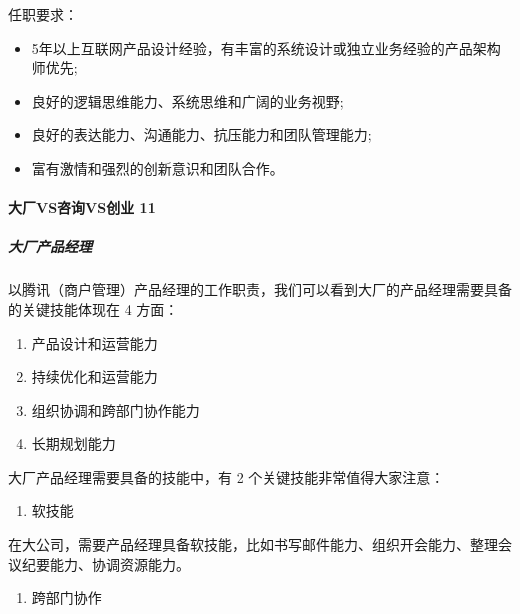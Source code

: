 \documentclass[letterpaper,10pt,english]{sphinxmanual}
\begin{document}
任职要求：
\begin{itemize}
\item {} 
5年以上互联网产品设计经验，有丰富的系统设计或独立业务经验的产品架构师优先;

\item {} 
良好的逻辑思维能力、系统思维和广阔的业务视野;

\item {} 
良好的表达能力、沟通能力、抗压能力和团队管理能力;

\item {} 
富有激情和强烈的创新意识和团队合作。

\end{itemize}


\paragraph{大厂VS咨询VS创业 11\sphinxfootnotemark[193]}
\label{\detokenize{chapter_introduction/PM:vsvs-11}}%
\begin{footnotetext}[193]\sphinxAtStartFootnote
{}
%
\end{footnotetext}\ignorespaces 

\subparagraph{大厂产品经理}
\label{\detokenize{chapter_introduction/PM:id41}}
以腾讯（商户管理）产品经理的工作职责，我们可以看到大厂的产品经理需要具备的关键技能体现在
4 方面：
\begin{enumerate}
%
\item {} 
产品设计和运营能力

\item {} 
持续优化和运营能力

\item {} 
组织协调和跨部门协作能力

\item {} 
长期规划能力

\end{enumerate}

大厂产品经理需要具备的技能中，有 2 个关键技能非常值得大家注意：
\begin{enumerate}
%
\item {} 
软技能

\end{enumerate}

在大公司，需要产品经理具备软技能，比如书写邮件能力、组织开会能力、整理会议纪要能力、协调资源能力。
\begin{enumerate}
%
\setcounter{enumi}{1}
\item {} 
跨部门协作

\end{enumerate}
\end{document}
